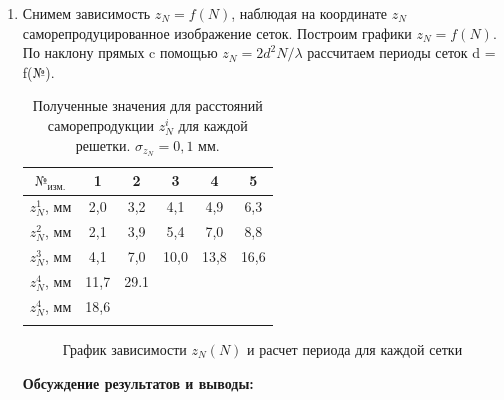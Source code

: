 \documentclass[a4paper, 12pt]{article}%
\begin{document}
\begin{enumerate}
		
		\item Снимем зависимость $z_N = f(N)$, наблюдая на координате $z_N$ саморепродуцированное изображение сеток. Построим графики $z_N = f(N)$. По наклону прямых c помощью $z_N = 2d^2N/\lambda$ рассчитаем периоды сеток d = f(№).		
		
		\begin{longtable}{|c|c|c|c|c|c|}
			\hline
			 $ \text{№} _\text{изм.}$   & 1 & 2 & 3 & 4 & 5 \\ \hline
			$z_N^1$, мм & 2,0 & 3,2 & 4,1 & 4,9 & 6,3 \\ \hline
			$z_N^2$, мм & 2,1 & 3,9 & 5,4 & 7,0 & 8,8 \\ \hline
			$z_N^3$, мм & 4,1 & 7,0 & 10,0 & 13,8 & 16,6 \\ \hline
			$z_N^4$, мм & 11,7 & 29.1 &  &  &  \\ \hline
			$z_N^4$, мм & 18,6 &  &  &  &  \\ \hline
			
			\caption{Полученные значения для расстояний саморепродукции  $z_N^i$ для каждой решетки. $\sigma_{z_N} = 0,1$ мм.}
		\end{longtable}
		
		\begin{figure}[H]
			\caption{График зависимости $z_N(N)$ и расчет периода для каждой сетки}
		\end{figure}
		
		
		\textbf{Обсуждение результатов и выводы: }\\
		
		\begin{longtable}{|c|c|c|c|}
			\hline
			

\end{longtable}
\end{enumerate}
\end{document}

